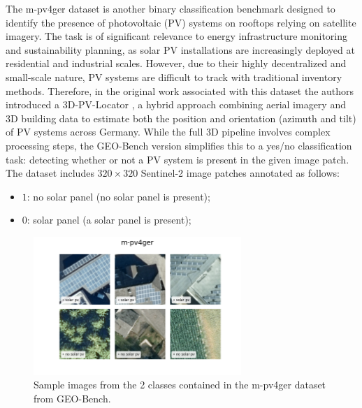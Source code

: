 \documentclass[a4paper, oneside, english]{sapthesis} %
\begin{document}
The m-pv4ger dataset is another binary classification benchmark designed to identify the presence of photovoltaic (PV) systems on rooftops relying on satellite imagery. The task is of significant relevance to energy infrastructure monitoring and sustainability planning, as solar PV installations are increasingly deployed at residential and industrial scales. However, due to their highly decentralized and small-scale nature, PV systems are difficult to track with traditional inventory methods. Therefore, in the original work associated with this dataset the authors introduced a 3D-PV-Locator \cite{mayer20223d}, a hybrid approach combining aerial imagery and 3D building data to estimate both the position and orientation (azimuth and tilt) of PV systems across Germany. While the full 3D pipeline involves complex processing steps, the GEO-Bench version simplifies this to a yes/no classification task: detecting whether or not a PV system is present in the given image patch. The dataset includes $320\times 320$ Sentinel-2 image patches annotated as follows:

\begin{itemize}
    \item $1$: no solar panel (no solar panel is present);
    \item $0$: solar panel (a solar panel is present);
\end{itemize}

\vspace{-0.3cm}

\begin{figure}[h]
    \centering
    \includegraphics[width=0.7\textwidth]{img/m-pv4ger_image_grid.png}
    \vspace{-0.5cm}
    \caption{\normalsize Sample images from the 2 classes contained in the m-pv4ger dataset from GEO-Bench.}
    \label{fig:solargrid}
\end{figure}
\end{document}

